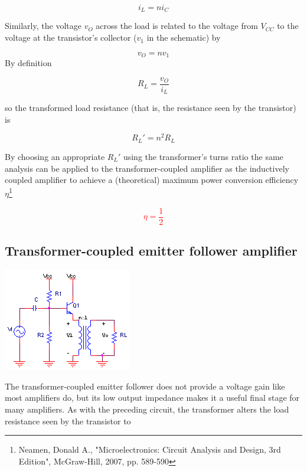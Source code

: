 \begin{equation}
i_{L} = ni_{C}
\end{equation}

Similarly, the voltage $v_{O}$ across the load is related to the voltage from $V_{CC}$ to the voltage at the transistor's collector ($v_{1}$ in the schematic) by

\begin{equation}
v_{O} = nv_{1}
\end{equation}
By definition

\begin{equation}
R_{L} = \frac{v_{O}}{i_{L}}
\end{equation}

so the transformed load resistance (that is, the resistance seen by the transistor) is

\begin{equation}
R_{L}' = n^{2}R_{L}
\end{equation}

By choosing an appropriate $R_{L}'$ using the transformer's turns ratio the same analysis can be applied to the transformer-coupled amplifier as the inductively coupled amplifier to achieve a (theoretical) maximum power conversion efficiency $\eta$\footnote{Neamen, Donald A., "Microelectronics: Circuit Analysis and Design, 3rd Edition", McGraw-Hill, 2007, pp. 589-590}

\textcolor{red}{
\begin{equation}
\eta = \frac{1}{2}
\end{equation}
}

\subsection{Transformer-coupled emitter follower amplifier}
\begin{center}
		\includegraphics{schematics/transformeremitterfollower.png}
\end{center}
The transformer-coupled emitter follower does not provide a voltage gain like most amplifiers do, but its low output impedance makes it a useful final stage for many amplifiers. As with the preceding circuit, the transformer alters the load resistance seen by the transistor to

